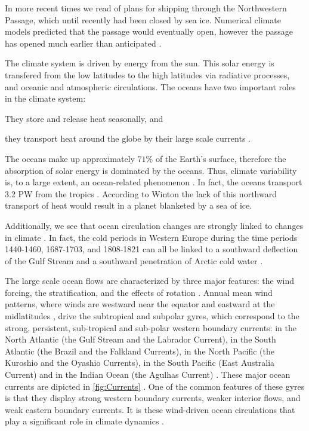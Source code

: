 In more recent times we read of plans for shipping through the Northwestern
Passage, which until recently had been closed by sea ice. Numerical climate
models predicted that the passage would eventually open, however the passage has
opened much earlier than anticipated \cite{NatGeo}.

The climate system is driven by energy from the sun. This solar energy is
transfered from the low latitudes to the high latitudes via radiative processes,
and oceanic and atmospheric circulations. The oceans have two important roles in
the climate system: \begin{inparaenum}[1)]\item They store and release heat
seasonally, and \item they transport heat around the globe by their large scale
currents \cite{Winton2003}. \end{inparaenum}  The oceans make up approximately
$71\%$ of the Earth's surface, therefore the absorption of solar energy is
dominated by the oceans.  Thus, climate variability is, to a large extent, an
ocean-related phenomenon \cite{Siedler01}. In fact, the oceans transport 3.2
PW from the tropics \cite{Trenberth2001}. According to Winton
\cite{Winton2003} the lack of this northward transport of heat would result in
a planet blanketed by a sea of ice.

Additionally, we see that ocean circulation changes are strongly linked to
changes in climate \cite{Morner95, Siedler01}. In fact, the cold periods in
Western Europe during the time periods 1440-1460, 1687-1703, and 1808-1821 can
all be linked to a southward deflection of the Gulf Stream and a southward
penetration of Arctic cold water \cite{Morner95}.

The large scale ocean flows are characterized by three major features: the wind
forcing, the stratification, and the effects of rotation \cite{Majda, Vallis06}.
Annual mean wind patterns, where winds are westward near the equator and
eastward at the midlatitudes \cite{Dijkstra08}, drive the subtropical and
subpolar gyres, which correspond to the strong, persistent, sub-tropical and
sub-polar western boundary currents: in the North Atlantic (the Gulf Stream and
the Labrador Current), in the South Atlantic (the Brazil and the Falkland
Currents), in the North Pacific (the Kuroshio and the Oyashio Currents), in the
South Pacific (East Australia Current) and in the Indian Ocean (the Agulhas
Current) \cite{Dijkstra08,Vallis06}. These major ocean currents are dipicted in
\autoref{fig:Currents} \cite{Haidvogel1999}. One of the common features of these
gyres is that they display strong western boundary currents, weaker interior
flows, and weak eastern boundary currents. It is these wind-driven ocean
circulations that play a significant role in climate dynamics
\cite{Beesley2008,Dijkstra05,Ekman1905,Ghil08}.

